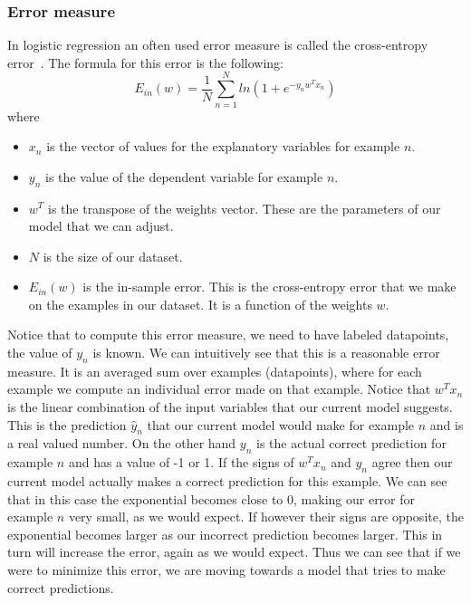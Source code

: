 \subsubsection{Error measure}
In logistic regression an often used error measure is called the cross-entropy error~\cite{caltechmachinelearning}. The formula for this error is the following:
$$
	E_{in}(w) = \frac{1}{N}\sum_{n=1}^{N}ln(1+e^{-y_{n}w^{T}x_{n}})
$$
where
\begin{itemize}
	\item $x_{n}$ is the vector of values for the explanatory variables for example $n$.
	\item $y_{n}$ is the value of the dependent variable for example $n$.
	\item $w^T$ is the transpose of the weights vector. These are the parameters of our model that we can adjust.
	\item $N$ is the size of our dataset.
	\item $E_{in}(w)$ is the in-sample error. This is the cross-entropy error that we make on the examples in our dataset. It is a function of the weights $w$.
\end{itemize}
Notice that to compute this error measure, we need to have labeled datapoints, the value of $y_{n}$ is known. We can intuitively see that this is a reasonable error measure. It is an averaged sum over examples (datapoints), where for each example we compute an individual error made on that example. Notice that $w^{T}x_{n}$ is the linear combination of the input variables that our current model suggests. This is the prediction $\hat{y}_{n}$ that our current model would make for example $n$ and is a real valued number. On the other hand $y_{n}$ is the actual correct prediction for example $n$ and has a value of -1 or 1. If the signs of $w^{T}x_{n}$ and $y_{n}$ agree then our current model actually makes a correct prediction for this example. We can see that in this case the exponential becomes close to 0, making our error for example $n$ very small, as we would expect. If however their signs are opposite, the exponential becomes larger as our incorrect prediction becomes larger. This in turn will increase the error, again as we would expect. Thus we can see that if we were to minimize this error, we are moving towards a model that tries to make correct predictions.
